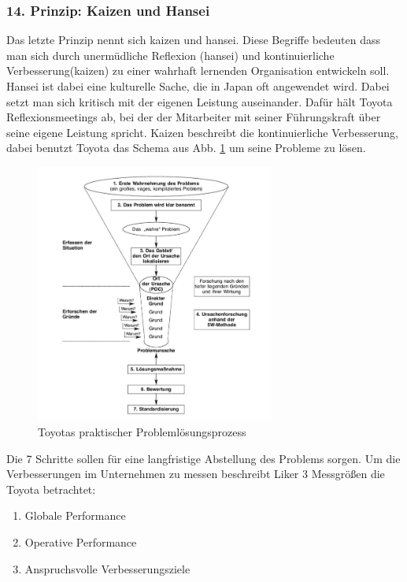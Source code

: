 \documentclass[a4paper,12pt]{scrartcl}
\begin{document}
\subsubsection{14. Prinzip: Kaizen und Hansei}

Das letzte Prinzip nennt sich kaizen und hansei. Diese Begriffe bedeuten dass man sich durch unermüdliche Reflexion (hansei) und kontinuierliche Verbesserung(kaizen) zu einer wahrhaft lernenden Organisation entwickeln soll. Hansei ist dabei eine kulturelle Sache, die in Japan oft angewendet wird. Dabei setzt man sich kritisch mit der eigenen Leistung auseinander. Dafür hält Toyota Reflexionsmeetings ab, bei der der Mitarbeiter mit seiner Führungskraft über seine eigene Leistung spricht. Kaizen beschreibt die kontinuierliche Verbesserung, dabei benutzt Toyota das Schema aus Abb. \ref{Problem} um seine Probleme zu lösen. 

\begin{figure}[h] 
  \centering
     \includegraphics[width=0.7\textwidth]{Problem.png}
  \caption{Toyotas praktischer Problemlösungsprozess}
  \label{Problem}
\end{figure}

Die 7 Schritte sollen für eine langfristige Abstellung des Problems sorgen. Um die Verbesserungen im Unternehmen zu messen beschreibt Liker 3 Messgrößen die Toyota betrachtet:

\begin{enumerate}
    \item Globale Performance
    \item Operative Performance
    \item Anspruchsvolle Verbesserungsziele
\end{enumerate}
\end{document}
